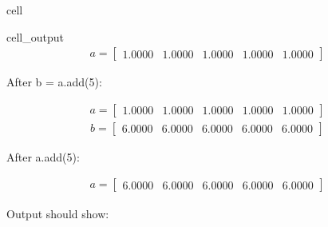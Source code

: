 \documentclass[letterpaper,10pt,english]{jupyterBook}
\begin{document}
\begin{sphinxuseclass}{cell}
\begin{sphinxVerbatimOutput}
\begin{sphinxuseclass}{cell_output}\begin{equation*}
\begin{split}\displaystyle a=\left[
\begin{array}{}
  1.0000 &  1.0000 &  1.0000 &  1.0000 &  1.0000
\end{array}
\right]\end{split}
\end{equation*}
\begin{sphinxVerbatim}[commandchars=\\\{\}]
After b = a.add(5):
\end{sphinxVerbatim}
\begin{equation*}
\begin{split}\displaystyle a=\left[
\begin{array}{}
  1.0000 &  1.0000 &  1.0000 &  1.0000 &  1.0000
\end{array}
\right]\end{split}
\end{equation*}\begin{equation*}
\begin{split}\displaystyle b=\left[
\begin{array}{}
  6.0000 &  6.0000 &  6.0000 &  6.0000 &  6.0000
\end{array}
\right]\end{split}
\end{equation*}
\begin{sphinxVerbatim}[commandchars=\\\{\}]
After a.add\PYGZus{}(5):
\end{sphinxVerbatim}
\begin{equation*}
\begin{split}\displaystyle a=\left[
\begin{array}{}
  6.0000 &  6.0000 &  6.0000 &  6.0000 &  6.0000
\end{array}
\right]\end{split}
\end{equation*}
\end{sphinxuseclass}\end{sphinxVerbatimOutput}

\end{sphinxuseclass}
\sphinxAtStartPar
Output should show:
\end{document}
